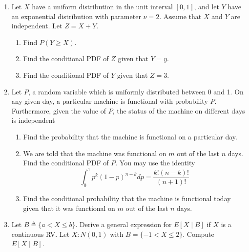 \documentclass[paper=usletter, fontsize=12pt]{article}
\begin{document}

    \begin{enumerate}

        \item Let $X$ have a uniform distribution in the unit interval $[0,1]$,
        and let $Y$ have an exponential distribution with parameter $\nu=2$.
        Assume that $X$ and $Y$ are independent. Let $Z=X+Y$.
        \begin{enumerate}

            \item Find $P(Y \ge X)$.

            \item Find the conditional PDF of $Z$ given that $Y=y$.

            \item Find the conditional PDF of $Y$ given that $Z=3$.

        \end{enumerate}

        \item Let $P$, a random variable which is uniformly distributed between
        0 and 1. On any given day, a particular machine is functional with
        probability $P$. Furthermore, given the value of $P$, the status of the
        machine on different days is independent
        \begin{enumerate}

            \item Find the probability that the machine is functional on a particular day.

            \item We are told that the machine was functional on $m$ out of the
            last $n$ days. Find the conditional PDF of $P$. You may use the
            identity
            \begin{equation*}
                \int_{0}^{1}p^k(1-p)^{n-k}dp=\frac{k!(n-k)!}{(n+1)!}
            \end{equation*}

            \item Find the conditional probability that the machine is
            functional today given that it was functional on $m$ out of the
            last $n$ days.

        \end{enumerate}

        \item Let $B \triangleq \{a < X \le b\}$. Derive a general expression
        for $E[X \mid B]$ if $X$ is a continuous RV. Let $X : N(0,1)$ with
        $B=\{-1 < X \le 2\}$. Compute $E[X \mid B]$.


\end{enumerate}
\end{document}
